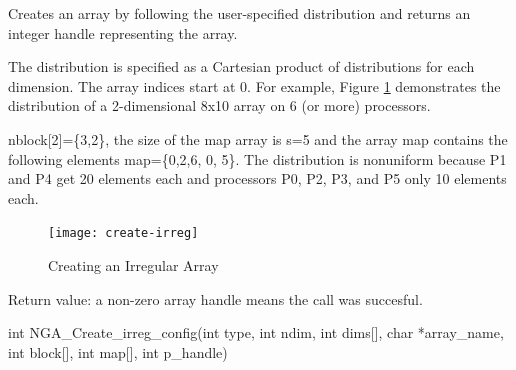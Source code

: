 \documentclass[10pt]{article}
\begin{document}
\dcoll

\begin{desc}

Creates an array by following the user-specified distribution and returns an
integer handle representing the array.

The distribution is specified as a Cartesian product of distributions for each
dimension. The array indices start at 0.  For example, Figure \ref{crirreg}
demonstrates the distribution of a 2-dimensional 8x10 array on 6 (or more)
processors.

nblock[2]=\{3,2\}, the size of the map array is s=5 and the array map contains
the following elements map=\{0,2,6, 0, 5\}. The distribution is nonuniform
because P1 and P4 get 20 elements each and processors P0, P2, P3, and P5 only
10 elements each.

\begin{figure}
\texttt{[image: create-irreg]}
\centering
\caption{Creating an Irregular Array}
\label{crirreg}
\end{figure}

Return value: a non-zero array handle means the call was succesful.

\end{desc}




\begin{capi}
\begin{ccode}
int NGA_Create_irreg_config(int type, int ndim, int dims[],
                            char *array_name, int block[], int map[],
                            int p_handle)
\end{ccode}
\begin{funcargs}
\end{funcargs}
\end{capi}
\end{document}
